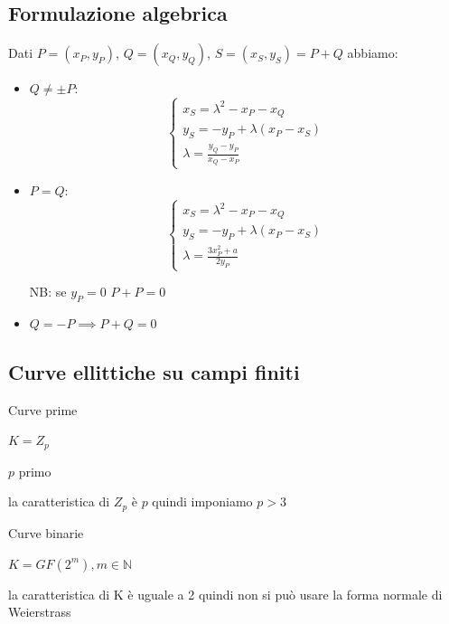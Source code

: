 \subsection{Formulazione algebrica}
Dati $P = (x_P, y_P)$, $Q = (x_Q, y_Q)$, $S = (x_S, y_S) = P+Q$ abbiamo:
\begin{itemize}
    \item $Q \neq \pm P$:
    \begin{equation}
        \begin{cases}
            x_S = \lambda^{2} - x_P - x_Q \\
            y_S = -y_P + \lambda(x_P - x_S) \\
            \lambda = \frac{y_Q - y_P}{x_Q - x_P}
        \end{cases}
    \end{equation}
    \item $P = Q$:
    \begin{equation}
        \begin{cases}
            x_S = \lambda^{2} - x_P - x_Q \\
            y_S = -y_P + \lambda(x_P - x_S) \\
            \lambda = \frac{3x_P^{2} + a}{2y_P}
        \end{cases}
    \end{equation}
    
    NB: se $y_P = 0$ $P+P=0$
    \item $Q = -P \implies P+Q = 0$
\end{itemize}

\subsection{Curve ellittiche su campi finiti}
\begin{minipage}{0.45\textwidth}
\centering
    Curve prime
    
    $K = Z_p$
    
    $p$ primo
    
    la caratteristica di $Z_p$ è $p$ quindi imponiamo $ p > 3 $
\end{minipage}
\hfill
\begin{minipage}{0.45\textwidth}
\centering
    Curve binarie
    
    $K = GF(2^m) , m \in \mathbb{N}$
    
    la caratteristica di K è uguale a 2 quindi non si può usare la forma normale di Weierstrass
\end{minipage}

